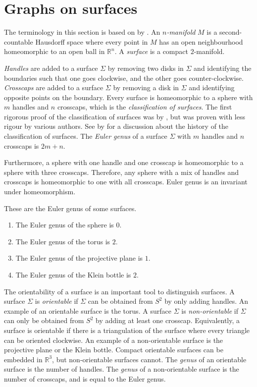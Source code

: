 \section{Graphs on surfaces}

The terminology in this section is based on  by \textcite{moharGraphsSurfaces2001}. An \textit{$n$-manifold} $M$ is a second-countable Hausdorff space where every point in $M$ has an open neighbourhood homeomorphic to an open ball in $\mathbb{R}^n$. A \textit{surface} is a compact $2$-manifold. 

\textit{Handles} are added to a surface \(\Sigma\) by removing two disks in \(\Sigma\) and identifying the boundaries such that one goes clockwise, and the other goes counter-clockwise. \textit{Crosscaps} are added to a surface $\Sigma$ by removing a disk in \(\Sigma\) and identifying opposite points on the boundary. Every surface is homeomorphic to a sphere with $m$ handles and $n$ crosscaps, which is the \textit{classification of surfaces}. The first rigorous proof of the classification of surfaces was by \textcite{brahanaSystemsCircuitsTwoDimensional1921}, but was proven with less rigour by various authors. See \cite{gallierClassificationTheoremCompact2013} by \citeauthor{gallierClassificationTheoremCompact2013} for a discussion about the history of the classification of surfaces. The \textit{Euler genus} of a surface \(\Sigma\) with $m$ handles and $n$ crosscaps is $2m + n$. 

Furthermore, a sphere with one handle and one crosscap is homeomorphic to a sphere with three crosscaps. Therefore, any sphere with a mix of handles and crosscaps is homeomorphic to one with all crosscaps. Euler genus is an invariant under homeomorphism. 

These are the Euler genus of some surfaces.
\begin{enumerate}
	\item The Euler genus of the sphere is \(0\).
	\item The Euler genus of the torus is \(2\).
	\item The Euler genus of the projective plane is \(1\). 
	\item The Euler genus of the Klein bottle is \(2\). 
\end{enumerate}

The orientability of a surface is an important tool to distinguish surfaces. A surface \(\Sigma\) is \textit{orientable} if \(\Sigma\) can be obtained from \(S^2\) by only adding handles. An example of an orientable surface is the torus. A surface \(\Sigma\) is \textit{non-orientable} if \(\Sigma\) can only be obtained from \(S^2\) by adding at least one crosscap. Equivalently, a surface is orientable if there is a triangulation of the surface where every triangle can be oriented clockwise. An example of a non-orientable surface is the projective plane or the Klein bottle. Compact orientable surfaces can be embedded in $\mathbb{R}^3$, but non-orientable surfaces cannot. The \textit{genus} of an orientable surface is the number of handles. The \textit{genus} of a non-orientable surface is the number of crosscaps, and is equal to the Euler genus. 

